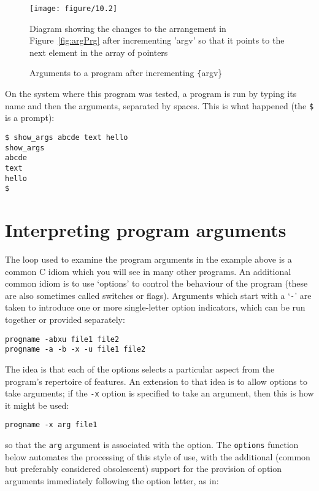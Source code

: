    \begin{figure*}\centering
     \texttt{[image: figure/10.2]}
     \caption*{Diagram showing the changes
       to the arrangement in Figure~\ref{fig:argPrg}
       after incrementing 'argv' so that it points to the next
       element in the array of pointers}
     \caption{\label{fig:argPrgInc}Arguments to a program after incrementing
       \texttt\{argv\}}
   \end{figure*}


  On the system where this program was tested, a program is run by typing
   its name and then the arguments, separated by spaces. This is what
   happened (the \texttt{\$} is a prompt):


  \begin{Verbatim}
$ show_args abcde text hello
show_args
abcde
text
hello
$
\end{Verbatim}

 
        \section{Interpreting program arguments}
        

  

  The loop used to examine the program arguments in the example above is
   a common C idiom which you will see in many other programs. An additional
   common idiom is to use `options' to control the behaviour of the
   program (these are also sometimes called switches or flags). Arguments which
   start with a `\texttt{-}' are taken to introduce one or more
   single-letter option indicators, which can be run together or provided
   separately:


  \begin{Verbatim}
progname -abxu file1 file2
progname -a -b -x -u file1 file2
\end{Verbatim}

  The idea is that each of the options selects a particular aspect from the
   program's repertoire of features. An extension to that idea is to allow
   options to take arguments; if the \texttt{-x} option is specified to
   take an argument, then this is how it might be used:


  \begin{Verbatim}
progname -x arg file1
\end{Verbatim}

  so that the \texttt{arg} argument is associated with the option. The
   \texttt{options} function below automates the processing of this style
   of use, with the additional (common but preferably considered obsolescent)
   support for the provision of option arguments immediately following the
   option letter, as in:


